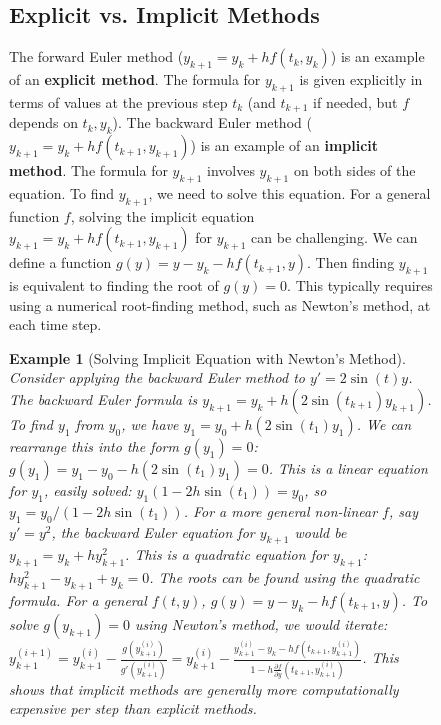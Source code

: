 \documentclass{article}
\newtheorem{example}{Example}
\newtheorem{example}{Example}
\begin{document}
\begin{figure}[h]
\subsection{Explicit vs. Implicit Methods}
The forward Euler method ($y_{k+1} = y_k + h f(t_k, y_k)$) is an example of an \textbf{explicit method}. The formula for $y_{k+1}$ is given explicitly in terms of values at the previous step $t_k$ (and $t_{k+1}$ if needed, but $f$ depends on $t_k, y_k$).
The backward Euler method ($y_{k+1} = y_k + h f(t_{k+1}, y_{k+1})$) is an example of an \textbf{implicit method}. The formula for $y_{k+1}$ involves $y_{k+1}$ on both sides of the equation. To find $y_{k+1}$, we need to solve this equation.
For a general function $f$, solving the implicit equation $y_{k+1} = y_k + h f(t_{k+1}, y_{k+1})$ for $y_{k+1}$ can be challenging. We can define a function $g(y) = y - y_k - h f(t_{k+1}, y)$. Then finding $y_{k+1}$ is equivalent to finding the root of $g(y) = 0$. This typically requires using a numerical root-finding method, such as Newton's method, at each time step.
\begin{example}[Solving Implicit Equation with Newton's Method]
Consider applying the backward Euler method to $y' = 2 \sin(t) y$. The backward Euler formula is $y_{k+1} = y_k + h (2 \sin(t_{k+1}) y_{k+1})$.
To find $y_1$ from $y_0$, we have $y_1 = y_0 + h (2 \sin(t_1) y_1)$.
We can rearrange this into the form $g(y_1) = 0$:
$g(y_1) = y_1 - y_0 - h (2 \sin(t_1) y_1) = 0$.
This is a linear equation for $y_1$, easily solved: $y_1 (1 - 2h \sin(t_1)) = y_0$, so $y_1 = y_0 / (1 - 2h \sin(t_1))$.
For a more general non-linear $f$, say $y' = y^2$, the backward Euler equation for $y_{k+1}$ would be $y_{k+1} = y_k + h y_{k+1}^2$. This is a quadratic equation for $y_{k+1}$: $h y_{k+1}^2 - y_{k+1} + y_k = 0$. The roots can be found using the quadratic formula.
For a general $f(t,y)$, $g(y) = y - y_k - h f(t_{k+1}, y)$. To solve $g(y_{k+1})=0$ using Newton's method, we would iterate:
$y_{k+1}^{(i+1)} = y_{k+1}^{(i)} - \frac{g(y_{k+1}^{(i)})}{g'(y_{k+1}^{(i)})} = y_{k+1}^{(i)} - \frac{y_{k+1}^{(i)} - y_k - h f(t_{k+1}, y_{k+1}^{(i)})}{1 - h \frac{\partial f}{\partial y}(t_{k+1}, y_{k+1}^{(i)})}$.
This shows that implicit methods are generally more computationally expensive per step than explicit methods.
\end{example}

\end{figure}
\end{document}
